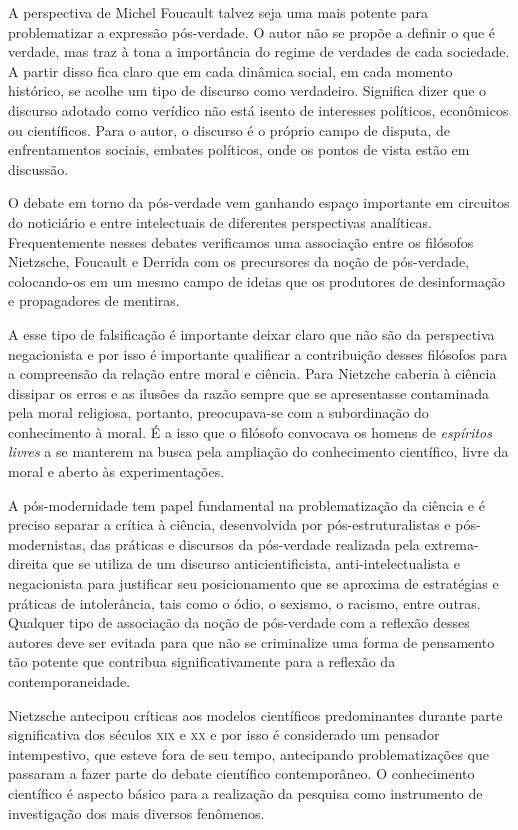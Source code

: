A perspectiva de Michel Foucault talvez seja uma mais potente para
problematizar a expressão pós-verdade. O autor não se propõe a definir o
que é verdade, mas traz à tona a importância do regime de verdades de
cada sociedade. A partir disso fica claro que em cada dinâmica social,
em cada momento histórico, se acolhe um tipo de discurso como
verdadeiro. Significa dizer que o discurso adotado como verídico não
está isento de interesses políticos, econômicos ou científicos. Para o
autor, o discurso é o próprio campo de disputa, de enfrentamentos
sociais, embates políticos, onde os pontos de vista estão em discussão.

O debate em torno da pós-verdade vem ganhando espaço importante em
circuitos do noticiário e entre intelectuais de diferentes perspectivas
analíticas. Frequentemente nesses debates verificamos uma associação
entre os filósofos Nietzsche, Foucault e Derrida com os precursores da
noção de pós-verdade, colocando-os em um mesmo campo de ideias que os
produtores de desinformação e propagadores de mentiras.

A esse tipo de falsificação é importante deixar claro que não
são da perspectiva negacionista e por isso é importante qualificar a
contribuição desses filósofos para a compreensão da relação entre moral
e ciência. Para Nietzche caberia à ciência dissipar os erros e as
ilusões da razão sempre que se apresentasse contaminada pela moral
religiosa, portanto, preocupava-se com a subordinação do conhecimento à
moral. É a isso que o filósofo convocava os homens de \textit{espíritos
livres} a se manterem na busca pela ampliação do conhecimento
científico, livre da moral e aberto às experimentações.

A pós-modernidade tem papel fundamental na problematização da ciência e
é preciso separar a crítica à ciência, desenvolvida por
pós-estruturalistas e pós-modernistas, das práticas e discursos da
pós-verdade realizada pela extrema-direita que se utiliza de um discurso
anticientificista, anti-intelectualista e negacionista para justificar
seu posicionamento que se aproxima de estratégias e práticas de
intolerância, tais como o ódio, o sexismo, o racismo, entre outras.
Qualquer tipo de associação da noção de pós-verdade com a reflexão
desses autores deve ser evitada para que não se criminalize uma forma de
pensamento tão potente que contribua significativamente para a reflexão
da contemporaneidade.

Nietzsche antecipou críticas aos modelos científicos
predominantes durante parte significativa dos séculos \textsc{xix} e \textsc{xx} e por
isso é considerado um pensador intempestivo, que esteve fora de seu
tempo, antecipando problematizações que passaram a fazer parte do debate
científico contemporâneo. O conhecimento científico é aspecto básico
para a realização da pesquisa como instrumento de investigação dos mais
diversos fenômenos.

